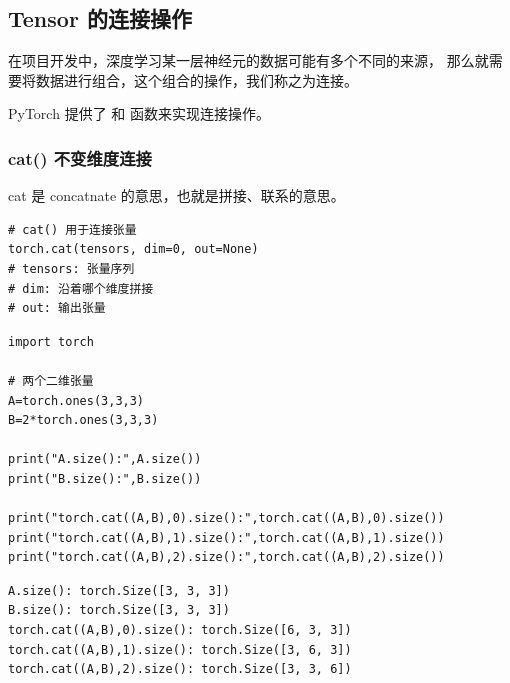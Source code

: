 \subsection{Tensor 的连接操作}
\label{subsec:Pytorch的Tensor的连接操作}
在项目开发中，深度学习某一层神经元的数据可能有多个不同的来源，
那么就需要将数据进行组合，这个组合的操作，我们称之为连接。

PyTorch 提供了  和  函数来实现连接操作。

\subsubsection{cat() 不变维度连接}
\label{subsubsec:Pytorch的cat()函数}
cat 是 concatnate 的意思，也就是拼接、联系的意思。

\begin{lstlisting}[style=demostyle,numbers=none]
# cat() 用于连接张量
torch.cat(tensors, dim=0, out=None)
# tensors: 张量序列
# dim: 沿着哪个维度拼接
# out: 输出张量
\end{lstlisting}
\begin{lstlisting}[style=pythonstyle]
import torch

# 两个二维张量
A=torch.ones(3,3,3)
B=2*torch.ones(3,3,3)

print("A.size():",A.size())
print("B.size():",B.size())

print("torch.cat((A,B),0).size():",torch.cat((A,B),0).size())
print("torch.cat((A,B),1).size():",torch.cat((A,B),1).size())
print("torch.cat((A,B),2).size():",torch.cat((A,B),2).size())
\end{lstlisting}
\begin{lstlisting}[style=demostyle,numbers=none]
A.size(): torch.Size([3, 3, 3])
B.size(): torch.Size([3, 3, 3])
torch.cat((A,B),0).size(): torch.Size([6, 3, 3])
torch.cat((A,B),1).size(): torch.Size([3, 6, 3])
torch.cat((A,B),2).size(): torch.Size([3, 3, 6])
\end{lstlisting}

